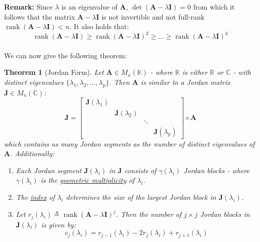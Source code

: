\documentclass[a4paper,10pt,oneside]{book}
\newtheorem{theorem}{Theorem}
\begin{document}
\noindent \textbf{Remark:} Since $\lambda$ is an eigenvalue of $\mathbf{A}$, $\operatorname{det}\left(\mathbf{A}-\lambda\mathbf{I}\right)=0$ from which it follows that the matrix $\mathbf{A}-\lambda\mathbf{I}$ is not invertible and not full-rank $\operatorname{rank}\left(\mathbf{A}-\lambda\mathbf{I}\right) < n$. It also holds that:
\begin{equation}
 \operatorname{rank}\left(\mathbf{A}-\lambda\mathbf{I}\right) \geq \operatorname{rank}\left(\mathbf{A}-\lambda\mathbf{I}\right)^2 \geq \ldots \geq \operatorname{rank}\left(\mathbf{A}-\lambda\mathbf{I}\right)^k
\end{equation}
\\
We can now give the following theorem:

\begin{theorem}[Jordan Form]
 Let $\mathbf{A}\in M_n(\mathbb{K})$ - where $\mathbb{K}$ is either $\mathbb{R}$ or $\mathbb{C}$ - with distinct eigenvalues $\{\lambda_1,\lambda_2,\ldots,\lambda_p\}$. Then $\mathbf{A}$ is similar to a Jordan matrix $\mathbf{J}\in M_n(\mathbb{C})$:
 \begin{equation}
 \mathbf{J}=\left[ {\begin{array}{ccccc}
          \mathbf{J}(\lambda_1)  \\
          & \mathbf{J}(\lambda_2)  \\
          && \ddots  \\
          &&& \mathbf{J}(\lambda_p)
         \end{array}}\right] \diamond \mathbf{A}
 \end{equation}
 which contains as many Jordan segments as the number of distinct eigenvalues of $\mathbf{A}$. 
 Additionally:
 \begin{enumerate}
  \item Each Jordan segment $\mathbf{J}(\lambda_i)$ in $\mathbf{J}$ consists of $\gamma(\lambda_i)$ Jordan blocks - where $\gamma(\lambda_i)$ is the \hyperlink{def:geoMult}{geometric multiplicity} of $\lambda_i$.
  \item The \hyperlink{def:indexOfEigenval}{index} of $\lambda_i$ determines the size of the largest Jordan block in $\mathbf{J}(\lambda_i)$.
  \item Let $r_j(\lambda_i)\triangleq \operatorname{rank}\left(\mathbf{A}-\lambda\mathbf{I}\right)^j$. Then the number of
  $j \times j$ Jordan blocks in $\mathbf{J}(\lambda_i)$ is given by:
    \begin{equation}\label{eq:numJordBlocks}
     c_j(\lambda_i)=r_{j-1}(\lambda_i)-2r_j(\lambda_i)+r_{j+1}(\lambda_i)
    \end{equation}
 \end{enumerate}
\end{theorem}
\end{document}
